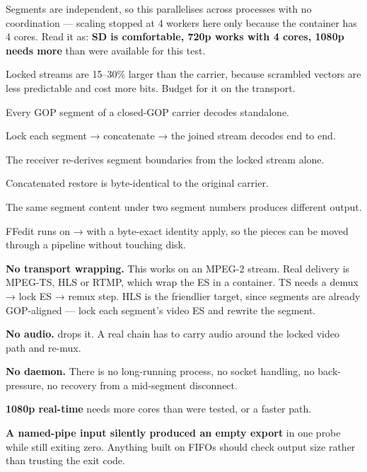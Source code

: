 \documentclass[fontpath=fonts/,logopath=logo/]{riposte-doc}
\begin{document}
Segments are independent, so this parallelises across processes with no coordination — scaling stopped at 4 workers here only because the container has 4 cores. Read it as: \textbf{SD is comfortable, 720p works with 4 cores, 1080p needs more} than were available for this test.

Locked streams are 15–30\% larger than the carrier, because scrambled vectors are less predictable and cost more bits. Budget for it on the transport.



\begin{ripbullets}
\item Every GOP segment of a closed-GOP carrier decodes standalone.
\item Lock each segment → concatenate → the joined stream decodes end to end.
\item The receiver re-derives segment boundaries from the locked stream alone.
\item Concatenated restore is byte-identical to the original carrier.
\item The same segment content under two segment numbers produces different output.
\item FFedit runs on  →  with a byte-exact identity apply, so the pieces can be moved through a pipeline without touching disk.
\end{ripbullets}



\begin{ripbullets}
\item \textbf{No transport wrapping.} This works on an MPEG-2  stream. Real delivery is MPEG-TS, HLS or RTMP, which wrap the ES in a container. TS needs a demux → lock ES → remux step. HLS is the friendlier target, since segments are already GOP-aligned — lock each segment's video ES and rewrite the segment.
\item \textbf{No audio.}  drops it. A real chain has to carry audio around the locked video path and re-mux.
\item \textbf{No daemon.} There is no long-running process, no socket handling, no back-pressure, no recovery from a mid-segment disconnect.
\item \textbf{1080p real-time} needs more cores than were tested, or a faster path.
\item \textbf{A named-pipe input silently produced an empty export} in one probe while still exiting zero. Anything built on FIFOs should check output size rather than trusting the exit code.
\end{ripbullets}

\ripend
\end{document}
